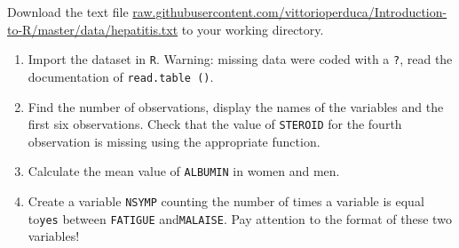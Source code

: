 \documentclass[]{book}
\providecommand{\tightlist}{%
  \setlength{\itemsep}{0pt}\setlength{\parskip}{0pt}}
\begin{document}
Download the text file \href{https://raw.githubusercontent.com/vittorioperduca/Introduction-to-R/master/data/hepatitis.txt}{raw.githubusercontent.com/vittorioperduca/Introduction-to-R/master/data/hepatitis.txt} to your working directory.

\begin{enumerate}
\def\labelenumi{\arabic{enumi}.}
\tightlist
\item
  Import the dataset in \texttt{R}. Warning: missing data were coded with a \texttt{?}, read the documentation of \texttt{read.table\ ()}.
\item
  Find the number of observations, display the names of the variables and the first six observations. Check that the value of \texttt{STEROID} for the fourth observation is missing using the appropriate function.
\item
  Calculate the mean value of \texttt{ALBUMIN} in women and men.
\item
  Create a variable \texttt{NSYMP} counting the number of times a variable is equal to\texttt{yes} between \texttt{FATIGUE} and\texttt{MALAISE}. Pay attention to the format of these two variables!
\end{enumerate}


\end{document}
